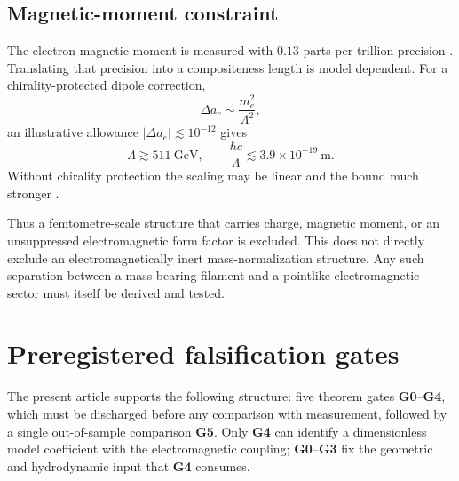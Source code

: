 \documentclass[aps,pre,preprint,notitlepage,nofootinbib,superscriptaddress]{revtex4-2}
\begin{document}
\subsection{Magnetic-moment constraint}

The electron magnetic moment is measured with \(0.13\) parts-per-trillion precision \cite{Fan2023}.  Translating that precision into a compositeness length is model dependent.  For a chirality-protected dipole correction,
\begin{equation}
  \Delta a_e
  \sim
  \frac{m_e^2}{\Lambda^2},
\end{equation}
an illustrative allowance \(|\Delta a_e|\lesssim10^{-12}\) gives
\begin{equation}
  \Lambda\gtrsim511\ \mathrm{GeV},
  \qquad
  \frac{\hbar c}{\Lambda}
  \lesssim3.9\times10^{-19}\ \mathrm m.
  \label{eq:gminus2-bound}
\end{equation}
Without chirality protection the scaling may be linear and the bound much stronger \cite{BrodskyDrell1980,GiudiceParadisiPassera2012}.

Thus a femtometre-scale structure that carries charge, magnetic moment, or an unsuppressed electromagnetic form factor is excluded.  This does not directly exclude an electromagnetically inert mass-normalization structure.  Any such separation between a mass-bearing filament and a pointlike electromagnetic sector must itself be derived and tested.

\section{Preregistered falsification gates}
\label{sec:programme}

The present article supports the following structure: five theorem gates \textbf{G0}--\textbf{G4}, which must be discharged before any comparison with measurement, followed by a single out-of-sample comparison \textbf{G5}.  Only \textbf{G4} can identify a dimensionless model coefficient with the electromagnetic coupling; \textbf{G0}--\textbf{G3} fix the geometric and hydrodynamic input that \textbf{G4} consumes.
\end{document}
